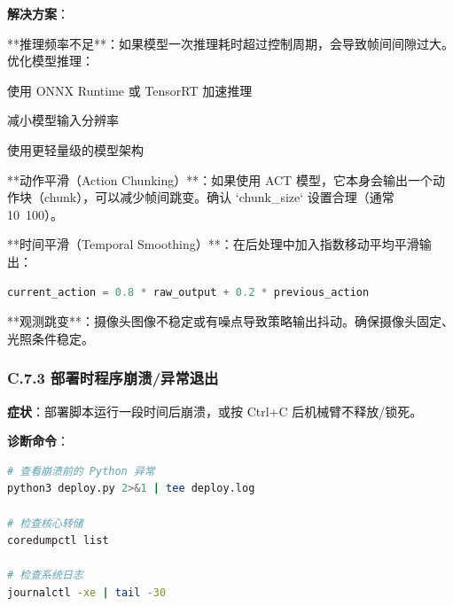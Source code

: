 \documentclass[UTF8,a4paper,11pt]{ctexart}
\begin{document}
{\textbf{解决方案}：
\item[1] **推理频率不足**：如果模型一次推理耗时超过控制周期，会导致帧间间隙过大。优化模型推理：
\item 使用 ONNX Runtime 或 TensorRT 加速推理
\item 减小模型输入分辨率
\item 使用更轻量级的模型架构
\item[2] **动作平滑（Action Chunking）**：如果使用 ACT 模型，它本身会输出一个动作块（chunk），可以减少帧间跳变。确认 `chunk_size` 设置合理（通常 10~100）。
\item[3] **时间平滑（Temporal Smoothing）**：在后处理中加入指数移动平均平滑输出：
\begin{lstlisting}[language=python]
   current_action = 0.8 * raw_output + 0.2 * previous_action
\end{lstlisting}
\item[4] **观测跳变**：摄像头图像不稳定或有噪点导致策略输出抖动。确保摄像头固定、光照条件稳定。

\subsubsection{C.7.3 部署时程序崩溃/异常退出}

\textbf{症状}：部署脚本运行一段时间后崩溃，或按 Ctrl+C 后机械臂不释放/锁死。

\textbf{诊断命令}：
\begin{lstlisting}[language=bash]
# 查看崩溃前的 Python 异常
python3 deploy.py 2>&1 | tee deploy.log

# 检查核心转储
coredumpctl list

# 检查系统日志
journalctl -xe | tail -30
\end{lstlisting}

}
\end{document}
